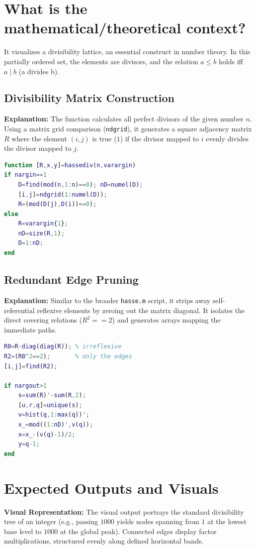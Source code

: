 \section{What is the mathematical/theoretical context?}
It visualizes a divisibility lattice, an essential construct in number theory. In this partially ordered set, the elements are divisors, and the relation $a \le b$ holds iff $a \mid b$ (a divides b). 

\subsection{Divisibility Matrix Construction}
\textbf{Explanation:} 
The function calculates all perfect divisors of the given number $n$. Using a matrix grid comparison (\texttt{ndgrid}), it generates a square adjacency matrix $R$ where the element $(i, j)$ is true ($1$) if the divisor mapped to $i$ evenly divides the divisor mapped to $j$.

\begin{lstlisting}[language=Matlab]
function [R,x,y]=hassediv(n,varargin)
if nargin==1
    D=find(mod(n,1:n)==0); nD=numel(D);
    [i,j]=ndgrid(1:numel(D));
    R=(mod(D(j),D(i))==0); 
else
    R=varargin{1};
    nD=size(R,1);
    D=1:nD;
end
\end{lstlisting}

\subsection{Redundant Edge Pruning}
\textbf{Explanation:} 
Similar to the broader \texttt{hasse.m} script, it strips away self-referential reflexive elements by zeroing out the matrix diagonal. It isolates the direct covering relations ($R^2 == 2$) and generates arrays mapping the immediate paths. 

\begin{lstlisting}[language=Matlab]
R0=R-diag(diag(R)); % irreflexive
R2=(R0^2==2);       % only the edges
[i,j]=find(R2);

if nargout>1
    s=sum(R)'-sum(R,2);
    [u,r,q]=unique(s);
    v=hist(q,1:max(q))';
    x_=mod((1:nD)',v(q));
    x=x_-(v(q)-1)/2;
    y=q-1;
end
\end{lstlisting}

\section{Expected Outputs and Visuals}
\textbf{Visual Representation:} The visual output portrays the standard divisibility tree of an integer (e.g., passing $1000$ yields nodes spanning from $1$ at the lowest base level to $1000$ at the global peak). Connected edges display factor multiplications, structured evenly along defined horizontal bands.


